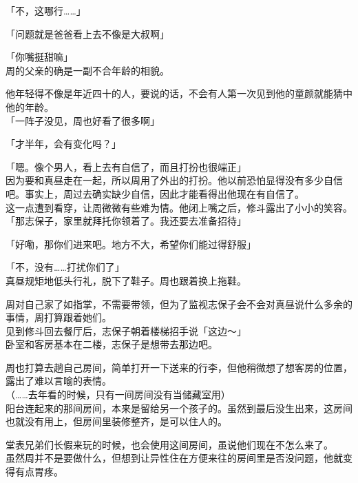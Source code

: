 「不，这哪行……」

「问题就是爸爸看上去不像是大叔啊」

「你嘴挺甜嘛」\\

周的父亲的确是一副不合年龄的相貌。

他年轻得不像是年近四十的人，要说的话，不会有人第一次见到他的童颜就能猜中他的年龄。\\

「一阵子没见，周也好看了很多啊」

「才半年，会有变化吗？」

「嗯。像个男人，看上去有自信了，而且打扮也很端正」\\

因为要和真昼走在一起，所以周用了外出的打扮。他以前恐怕显得没有多少自信吧。事实上，周过去确实缺少自信，因此才能看得出他现在有自信了。\\

这一点遭到看穿，让周微微有些难为情。他闭上嘴之后，修斗露出了小小的笑容。\\

「那志保子，家里就拜托你领着了。我还要去准备招待」

「好嘞，那你们进来吧。地方不大，希望你们能过得舒服」

「不，没有……打扰你们了」\\

真昼规矩地低头行礼，脱下了鞋子。周也跟着换上拖鞋。

周对自己家了如指掌，不需要带领，但为了监视志保子会不会对真昼说什么多余的事情，周打算跟着她们。\\

见到修斗回去餐厅后，志保子朝着楼梯招手说「这边～」\\

卧室和客房基本在二楼，志保子是想带去那边吧。

周也打算去趟自己房间，简单打开一下送来的行李，但他稍微想了想客房的位置，露出了难以言喻的表情。\\

（……去年看的时候，只有一间房间没有当储藏室用）\\

阳台连起来的那间房间，本来是留给另一个孩子的。虽然到最后没生出来，这房间也就没有用上，但房间里装修整齐，是可以住人的。

堂表兄弟们长假来玩的时候，也会使用这间房间，虽说他们现在不怎么来了。\\

虽然周并不是要做什么，但想到让异性住在方便来往的房间里是否没问题，他就变得有点胃疼。\\

